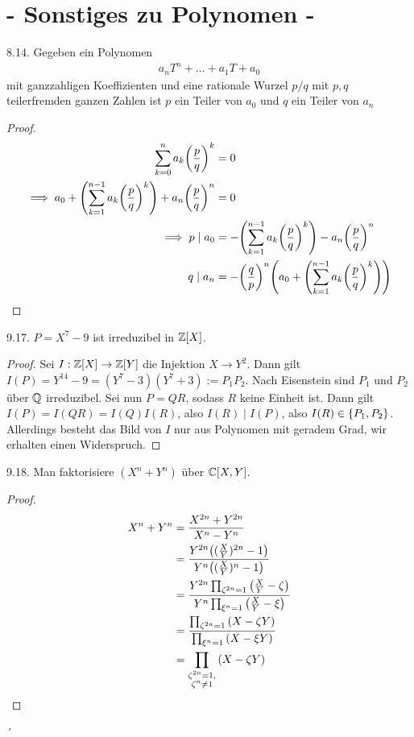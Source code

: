 \documentclass{article}
\newcommand{\ex}[1]{\tit{Übung} #1.}
\begin{document}
	\section*{\centering - Sonstiges zu Polynomen -}
		\ex{8.14} Gegeben ein Polynomen
		\begin{align*}
			a_n T^n + \hdots + a_1T + a_0
		\end{align*}
		mit ganzzahligen Koeffizienten und eine rationale Wurzel $p/q$ mit $p,q$ teilerfremden ganzen Zahlen ist $p$ ein Teiler von $a_0$ und $q$ ein Teiler von $a_n$
		\begin{proof}
			\begin{align*}
				\sum_{k = 0}^n a_k \qty(\frac{p}{q})^k &= 0\\
				\implies a_0 + \qty(\sum_{k = 1}^{n-1} a_k \qty(\frac{p}{q})^k) + a_n \qty(\frac{p}{q})^n &= 0\\
				\implies p \mid a_0 &= - \qty(\sum_{k = 1}^{n-1} a_k \qty(\frac{p}{q})^k) - a_n \qty(\frac{p}{q})^n\\
				q \mid a_n &= -\qty(\frac{q}{p})^n\qty(a_0 + \qty(\sum_{k = 1}^{n-1} a_k \qty(\frac{p}{q})^k))
			\end{align*}
		\end{proof}
		\newpar
		\ex{9.17} $P = X^7 - 9$ ist irreduzibel in $\mathbb{Z}[X]$.
		\begin{proof}
			Sei $I : \mathbb{Z}[X] \to \mathbb{Z}[Y]$ die Injektion $X \to Y^2$. Dann gilt $I(P) = Y^{14} - 9 = (Y^7 - 3)(Y^7 + 3) := P_1P_2$. Nach Eisenstein sind $P_1$ und $P_2$ über $\mathbb{Q}$ irreduzibel.
			\newpar
			Sei nun $P = QR$, sodass $R$ keine Einheit ist. Dann gilt $I(P) = I(QR) = I(Q) I(R)$, also $I(R) \mid I(P)$, also $I(R) \in \qty{P_1, P_2}$. Allerdings besteht das Bild von $I$ nur aus Polynomen mit geradem Grad, wir erhalten einen Widerspruch.
		\end{proof}
		\newpar
		\ex{9.18} Man faktorisiere $(X^n + Y^n)$ über $\mathbb{C}[X,Y]$.
		\begin{proof}
			\begin{align*}
				X^n + Y^n &= \frac{X^{2n} + Y^{2n}}{X^n - Y^n}\\
				&= \frac{Y^{2n} \qty((\frac{X}{Y})^{2n} - 1)}{Y^n \qty((\frac{X}{Y})^{n} - 1)}\\
				&= \frac{Y^{2n} \prod_{\zeta^{2n} = 1}\qty(\frac{X}{Y} - \zeta)}{Y^n \prod_{\xi^n = 1}\qty(\frac{X}{Y} - \xi)}\\
				&= \frac{\prod_{\zeta^{2n} = 1}\qty(X - \zeta Y)}{\prod_{\xi^n = 1}\qty(X - \xi Y)}\\
				&= \prod_{\substack{\zeta^{2n} = 1, \\\zeta^n \neq 1}}\qty(X - \zeta Y)
			\end{align*}
		\end{proof}´
\end{document}
